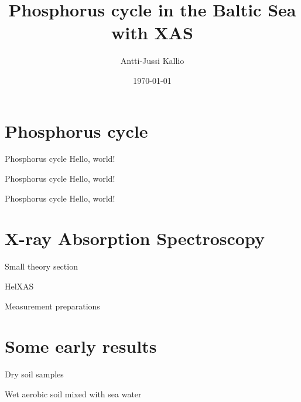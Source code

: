 \documentclass{beamer}
\title{Phosphorus cycle in the Baltic Sea with XAS}
\date{\today}
\author{Antti-Jussi Kallio}
\institute{University of Helsinki}
\begin{document}
  \maketitle
  \section{Phosphorus cycle}
  \begin{frame}{Phosphorus cycle}
    Hello, world!
  \end{frame}
  \begin{frame}{Phosphorus cycle}
    Hello, world!
  \end{frame}
  \begin{frame}{Phosphorus cycle}
    Hello, world!
  \end{frame}
  
  \section{X-ray Absorption Spectroscopy}
  \begin{frame}{Small theory section}
  
  \end{frame}
  \begin{frame}{HelXAS}
  
  \end{frame}
  \begin{frame}{Measurement preparations}
  
  \end{frame}
  \section{Some early results}
  \begin{frame}{Dry soil samples}
  
  \end{frame}
  \begin{frame}{Wet aerobic soil mixed with sea water}
  
  \end{frame}
\end{document}
